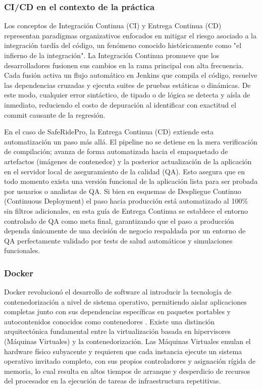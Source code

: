 \documentclass{article}
\begin{document}
\subsubsection*{CI/CD en el contexto de la práctica}
Los conceptos de Integración Continua (CI) y Entrega Continua (CD) representan paradigmas organizativos enfocados en mitigar el riesgo asociado a la integración tardía del código, un fenómeno conocido históricamente como "el infierno de la integración". La Integración Continua promueve que los desarrolladores fusionen sus cambios en la rama principal con alta frecuencia. Cada fusión activa un flujo automático en Jenkins que compila el código, resuelve las dependencias cruzadas y ejecuta suites de pruebas estáticas o dinámicas. De este modo, cualquier error sintáctico, de tipado o de lógica se detecta y aísla de inmediato, reduciendo el costo de depuración al identificar con exactitud el commit causante de la regresión.

En el caso de SafeRidePro, la Entrega Continua (CD) extiende esta automatización un paso más allá. El pipeline no se detiene en la mera verificación de compilación; avanza de forma automatizada hacia el empaquetado de artefactos (imágenes de contenedor) y la posterior actualización de la aplicación en el servidor local de aseguramiento de la calidad (QA). Esto asegura que en todo momento exista una versión funcional de la aplicación lista para ser probada por usuarios o analistas de QA. Si bien en esquemas de Despliegue Continuo (Continuous Deployment) el paso hacia producción está automatizado al 100\% sin filtros adicionales, en esta guía de Entrega Continua se establece el entorno controlado de QA como meta final, garantizando que el paso a producción dependa únicamente de una decisión de negocio respaldada por un entorno de QA perfectamente validado por tests de salud automáticos y simulaciones funcionales.

\subsubsection*{Docker}
Docker revolucionó el desarrollo de software al introducir la tecnología de contenedorización a nivel de sistema operativo, permitiendo aislar aplicaciones completas junto con sus dependencias específicas en paquetes portables y autocontenidos conocidos como contenedores \cite{dockeroverview}. Existe una distinción arquitectónica fundamental entre la virtualización basada en hipervisores (Máquinas Virtuales) y la contenedorización. Las Máquinas Virtuales emulan el hardware físico subyacente y requieren que cada instancia ejecute un sistema operativo invitado completo, con sus propios controladores y asignación rígida de memoria, lo cual resulta en altos tiempos de arranque y desperdicio de recursos del procesador en la ejecución de tareas de infraestructura repetitivas.
\end{document}
